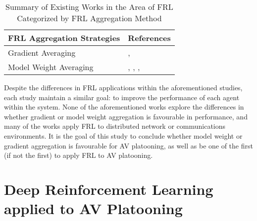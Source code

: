 \begin{table}[H]
  \centering
  \caption{Summary of Existing Works in the Area of FRL Categorized by FRL Aggregation Method}
    \begin{tabular}{ll} \toprule
    \textbf{FRL Aggregation Strategies} & \textbf{References} \\ \midrule
    \midrule
    Gradient Averaging & \cite{BrendanMcMahan2017a}, \cite{LimHyun2021} \\
    Model Weight Averaging & \cite{Liang2019}, \cite{ZhangX2020}, \cite{WangXiaofei2021}, \cite{Huang2021} \\ \bottomrule
    \end{tabular}%
  \label{tab:addlabel}%
\end{table}%


Despite the differences in FRL applications within the aforementioned studies, each study
maintain a similar goal: to improve the performance of each agent within the system.  None
of the aforementioned works explore the differences in whether gradient or model weight
aggregation is favourable in performance, and many of the works apply FRL to distributed
network or communications environments.  It is the goal of this study to conclude whether
model weight or gradient aggregation is favourable for AV platooning, as well as be one of
the first (if not the first) to apply FRL to AV platooning.



\section{Deep Reinforcement Learning applied to AV Platooning} \label{sec:avRL}

